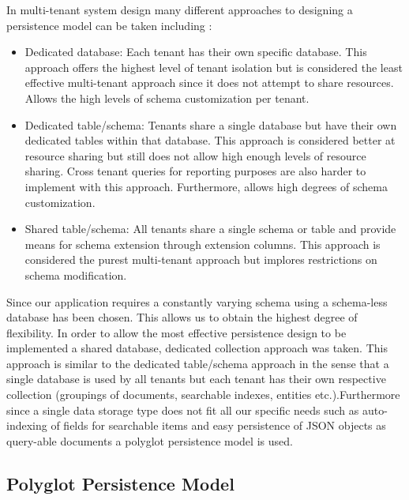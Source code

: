 In multi-tenant system design many different approaches to designing a persistence model can be taken including \cite{Krebs2012}:

\begin{itemize}
\item Dedicated database: Each tenant has their own specific database. This approach offers the highest level of tenant isolation but is considered the least effective multi-tenant approach since it does not attempt to share resources. Allows the high levels of schema customization per tenant.
\item Dedicated table/schema: Tenants share a single database but have their own dedicated tables within that database. This approach is considered better at resource sharing but still does not allow high enough levels of resource sharing. Cross tenant queries for reporting purposes are also harder to implement with this approach. Furthermore, allows high degrees of schema customization.
\item Shared table/schema: All tenants share a single schema or table and provide means for schema extension through extension columns. This approach is considered the purest multi-tenant approach but implores restrictions on schema modification.
\end{itemize}


Since our application requires a constantly varying schema using a schema-less database has been chosen. This allows us to obtain the highest degree of flexibility. In order to allow the most effective persistence design to be implemented a shared database, dedicated collection approach was taken. This approach is similar to the dedicated table/schema approach in the sense that a single database is used by all tenants but each tenant has their own respective collection (groupings of documents, searchable indexes, entities etc.).Furthermore since a single data storage type does not fit all our specific needs such as auto-indexing of fields for searchable items and easy persistence of JSON objects as query-able documents a polyglot persistence model is used.


\subsection{Polyglot Persistence Model}

